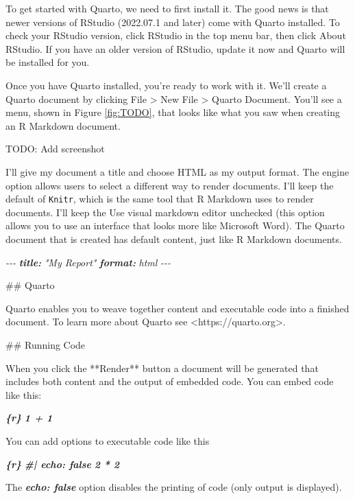 \documentclass[
]{book}
\newenvironment{Shaded}{\begin{snugshade}}{\end{snugshade}}
\newcommand{\AnnotationTok}[1]{\textcolor[rgb]{0.56,0.35,0.01}{\textbf{\textit{#1}}}}
\newcommand{\CommentTok}[1]{\textcolor[rgb]{0.56,0.35,0.01}{\textit{#1}}}
\newcommand{\FunctionTok}[1]{\textcolor[rgb]{0.00,0.00,0.00}{#1}}
\newcommand{\InformationTok}[1]{\textcolor[rgb]{0.56,0.35,0.01}{\textbf{\textit{#1}}}}
\newcommand{\NormalTok}[1]{#1}
\newcommand{\OtherTok}[1]{\textcolor[rgb]{0.56,0.35,0.01}{#1}}
\begin{document}
To get started with Quarto, we need to first install it. The good news is that newer versions of RStudio (2022.07.1 and later) come with Quarto installed. To check your RStudio version, click RStudio in the top menu bar, then click About RStudio. If you have an older version of RStudio, update it now and Quarto will be installed for you.

Once you have Quarto installed, you're ready to work with it. We'll create a Quarto document by clicking File \textgreater{} New File \textgreater{} Quarto Document. You'll see a menu, shown in Figure \ref{fig:TODO}, that looks like what you saw when creating an R Markdown document.

TODO: Add screenshot

I'll give my document a title and choose HTML as my output format. The engine option allows users to select a different way to render documents. I'll keep the default of \texttt{Knitr}, which is the same tool that R Markdown uses to render documents. I'll keep the Use visual markdown editor unchecked (this option allows you to use an interface that looks more like Microsoft Word). The Quarto document that is created has default content, just like R Markdown documents.

\begin{Shaded}
\begin{Highlighting}[]
\CommentTok{{-}{-}{-}}
\AnnotationTok{title:}\CommentTok{ "My Report"}
\AnnotationTok{format:}\CommentTok{ html}
\CommentTok{{-}{-}{-}}

\FunctionTok{\#\# Quarto}

\NormalTok{Quarto enables you to weave together content and executable code into a finished document. To learn more about Quarto see }\OtherTok{\textless{}https://quarto.org\textgreater{}}\NormalTok{.}

\FunctionTok{\#\# Running Code}

\NormalTok{When you click the **Render** button a document will be generated that includes both content and the output of embedded code. You can embed code like this:}

\InformationTok{\textasciigrave{}\textasciigrave{}\textasciigrave{}\{r\}}
\InformationTok{1 + 1}
\InformationTok{\textasciigrave{}\textasciigrave{}\textasciigrave{}}

\NormalTok{You can add options to executable code like this }

\InformationTok{\textasciigrave{}\textasciigrave{}\textasciigrave{}\{r\}}
\InformationTok{\#| echo: false}
\InformationTok{2 * 2}
\InformationTok{\textasciigrave{}\textasciigrave{}\textasciigrave{}}

\NormalTok{The }\InformationTok{\textasciigrave{}echo: false\textasciigrave{}}\NormalTok{ option disables the printing of code (only output is displayed).}
\end{Highlighting}
\end{Shaded}
\end{document}
